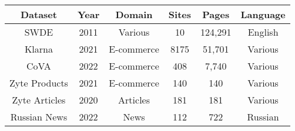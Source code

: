 \renewcommand{\arraystretch}{1.15}

\begin{tabular}{| c | c c c c c |}
    \hline
    Dataset & Year & Domain & Sites & Pages & Language\\
    
    \hline
    SWDE & 2011 & Various & 10 & 124,291 & English\\
    Klarna & 2021 & E-commerce & 8175 & 51,701 & Various\\ %
    CoVA & 2022 & E-commerce & 408 & 7,740 & Various\\ %
    Zyte Products & 2021 & E-commerce & 140 & 140 & Various\\
    Zyte Articles & 2020 & Articles & 181 & 181 & Various\\
    Russian News & 2022 & News & 112 & 722 & Russian\\ 
    \hline
\end{tabular}